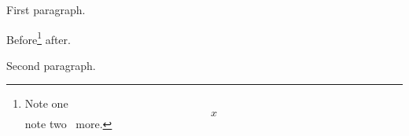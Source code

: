 \documentclass{article}
\begin{document}
First paragraph.

Before\footnote{Note one \[ x \] note two \lxmbf\ more.} after.

Second paragraph.
\end{document}
